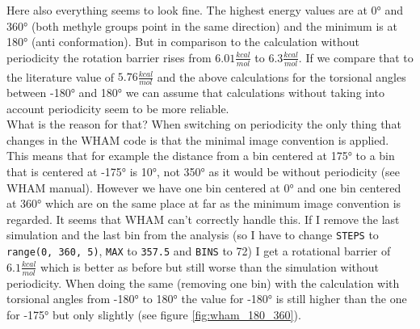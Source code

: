\documentclass[a4paper,11pt]{scrartcl}
\newcommand{\myCite}[1]{\textsuperscript{\cite{#1}}}
\begin{document}
Here also everything seems to look fine. The highest energy values are at 0° and 360° (both methyle groups point in the same direction) and the minimum is at 180° (anti conformation). But in comparison to the calculation without periodicity the rotation barrier rises from $6.01 \frac{kcal}{mol}$ to $6.3 \frac{kcal}{mol}$. If we compare that to the literature value of $5.76 \frac{kcal}{mol}$\myCite{becker_development_2015} and the above calculations for the torsional angles between -180° and 180° we can assume that calculations without taking into account periodicity seem to be more reliable.
\\

What is the reason for that? When switching on periodicity the only thing that changes in the WHAM code is that the minimal image convention is applied. This means that for example the distance from a bin centered at 175° to a bin that is centered at -175° is 10°, not 350° as it would be without periodicity (see WHAM manual). However we have one bin centered at 0° and one bin centered at 360° which are on the same place at far as the minimum image convention is regarded. It seems that WHAM can't correctly handle this. If I remove the last simulation and the last bin from the analysis (so I have to change \texttt{STEPS} to \texttt{range(0, 360, 5)}, \texttt{MAX} to \texttt{357.5} and \texttt{BINS} to 72) I get a rotational barrier of $6.1 \frac{kcal}{mol}$ which is better as before but still worse than the simulation without periodicity. When doing the same (removing one bin) with the calculation with torsional angles from -180° to 180° the value for -180° is still higher than the one for -175° but only slightly (see figure \ref{fig:wham_180_360}).
\end{document}
